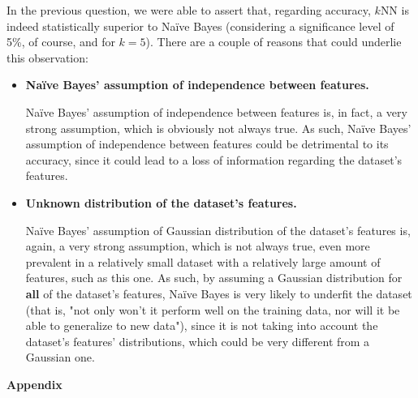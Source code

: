 \documentclass[12pt]{article}
\begin{document}
\begin{enumerate}[leftmargin=\labelsep,resume]
        \vspace*{0.5cm}

        In the previous question, we were able to assert that, regarding accuracy, $k$NN is
        indeed statistically superior to Naïve Bayes (considering a significance level of
        5\%, of course, and for $k = 5$). There are a couple of reasons that could underlie this observation:

        \begin{itemize}
          \item \textbf{Naïve Bayes' assumption of independence between features.}

                Naïve Bayes' assumption of independence between features is, in fact, a very
                strong assumption, which is obviously not always true.
                As such, Naïve Bayes' assumption of independence between features could be
                detrimental to its accuracy, since it could lead to a loss of information
                regarding the dataset's features.

          \item \textbf{Unknown distribution of the dataset's features.}

                Naïve Bayes' assumption of Gaussian distribution of the dataset's features
                is, again, a very strong assumption, which is not always true,
                even more prevalent in a relatively small dataset with a relatively large
                amount of features, such as this one. As such, by assuming a Gaussian distribution
                for \textbf{all} of the dataset's features, Naïve Bayes is very likely to
                underfit the dataset (that is, "not only won't it perform well on the training data,
                nor will it be able to generalize to new data"), since it is not taking into account the dataset's
                features' distributions, which could be very different from a Gaussian one.
        \end{itemize}

\end{enumerate}

\pagebreak

\large{\textbf{Appendix}\vskip 0.3cm}


\end{document}
